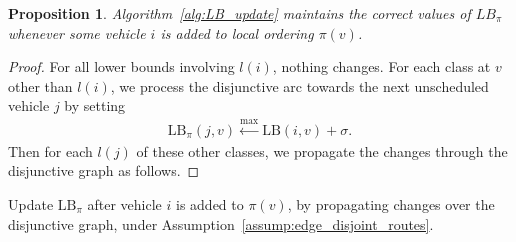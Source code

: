 \documentclass{article}
\theoremstyle{definition}
\theoremstyle{plain}
\newtheorem{proposition}{Proposition}
\begin{document}
\begin{proposition}
  Algorithm~\ref{alg:LB_update} maintains the correct values of $LB_{\pi}$
  whenever some vehicle $i$ is added to local ordering $\pi(v)$.
\end{proposition}
\begin{proof}
  For all lower bounds involving $l(i)$, nothing changes.
  For each class at $v$ other than $l(i)$, we process the disjunctive arc
  towards the next unscheduled vehicle $j$ by setting
  \begin{align*}
    \mathrm{LB}_{\pi}(j, v) \xleftarrow{\max} \mathrm{LB}(i, v) + \sigma .
  \end{align*}
  Then for each $l(j)$ of these other classes, we propagate the changes through
  the disjunctive graph as follows.
\end{proof}


\begin{algorithm}
  \caption{Update $\mathrm{LB}_{\pi}$ after vehicle $i$ is added to $\pi(v)$, by
    propagating changes over the disjunctive graph, under
    Assumption~\ref{assump:edge_disjoint_routes}.}\label{alg:LB_update}
\begin{algorithmic}[1]
\end{algorithmic}
\end{algorithm}










\end{document}
